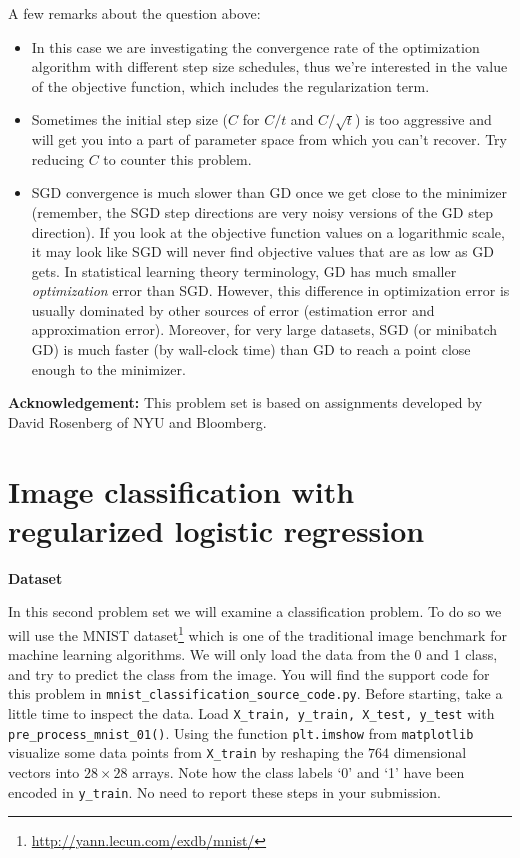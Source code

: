 \documentclass{article}
\begin{document}
A few remarks about the question above:
\begin{itemize}
\item In this case we are investigating the convergence rate of
the optimization algorithm with different step size schedules, thus
we're interested in the value of the objective function, which includes
the regularization term.
\item Sometimes the initial step size ($C$
for $C/t$ and $C/\sqrt{t}$) is too aggressive and will get you into
a part of parameter space from which you can't recover. Try reducing $C$ to counter this problem. 
\item SGD
convergence is much slower than GD once we get close to the minimizer
(remember, the SGD step directions are very noisy versions of the
GD step direction). If you look at the objective function values on
a logarithmic scale, it may look like SGD will never find objective
values that are as low as GD gets. In statistical learning theory terminology, GD has much smaller \emph{optimization} error than SGD. However,
this difference in optimization error is usually dominated by other
sources of error (estimation error and approximation error). Moreover,
for very large datasets, SGD (or minibatch GD) is much faster (by
wall-clock time) than GD to reach a point close enough
to the minimizer. 
\end{itemize}

{\bf Acknowledgement:} This problem set is based on assignments developed by David Rosenberg of NYU and Bloomberg.


\section{\large Image classification with regularized logistic regression}


{\color{nyupurple} \large \bf Dataset}  

In this second problem set we will examine a classification problem. To do so we will use the MNIST dataset\footnote{\url{http://yann.lecun.com/exdb/mnist/}} which is one of the traditional image benchmark for machine learning algorithms. We will only load the data from the 0 and 1 class, and try to predict the class from the image. You will find the support code for this problem in \texttt{mnist\_classification\_source\_code.py}.
Before starting, take a little time to inspect the data. Load \texttt{X\_train, y\_train, X\_test, y\_test} with \texttt{pre\_process\_mnist\_01()}. Using the function \texttt{plt.imshow} from \texttt{matplotlib} visualize some data points from \texttt{X\_train} by reshaping the $764$ dimensional vectors into $28 \times 28$ arrays. Note how the class labels `0' and `1' have been encoded in \texttt{y\_train}. No need to report these steps in your submission.
\end{document}
